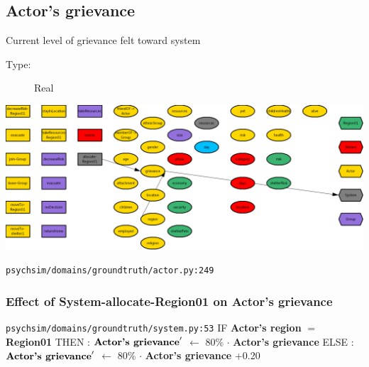 \documentclass{article}%
\begin{document}
%
\subsection{Actor's grievance}%
\label{subsec:Actor's grievance}%
Current level of grievance felt toward system%
\begin{description}%
\item[Type:]%
Real%
\end{description}%
\includegraphics[width=\textwidth]{images/grievanceOfActor.png}%
\begin{flushleft}%
\verb|psychsim/domains/groundtruth/actor.py:249|%
\end{flushleft}%
\subsubsection{Effect of System{-}allocate{-}Region01 on Actor's grievance}%
\label{ssubsec:Effect of System{-}allocate{-}Region01 on Actor's grievance}%
\begin{flushleft}%
\verb|psychsim/domains/groundtruth/system.py:53|%
\linebreak%
IF %
\textbf{Actor's region}%
$=$%
\textbf{Region01}%
\linebreak%
\hspace*{2em}%
THEN %
: %
$\mbox{\textbf{Actor's grievance}} '$%
$\leftarrow$%
80\%%
$\cdot$%
\textbf{Actor's grievance}%
\linebreak%
\hspace*{2em}%
ELSE %
: %
$\mbox{\textbf{Actor's grievance}} '$%
$\leftarrow$%
80\%%
$\cdot$%
\textbf{Actor's grievance}%
+0.20%
\end{flushleft}

%
\end{document}
